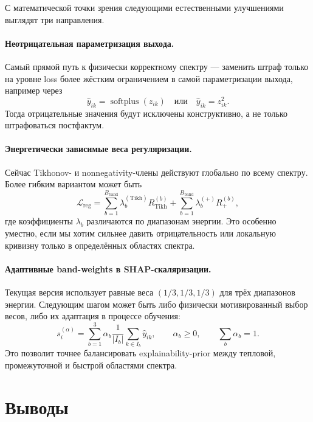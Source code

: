 С математической точки зрения следующими естественными улучшениями выглядят три направления.

\paragraph{Неотрицательная параметризация выхода.}
Самый прямой путь к физически корректному спектру --- заменить штраф только на уровне loss более жёстким ограничением в самой параметризации выхода, например через
\begin{equation}
\hat{y}_{ik} = \operatorname{softplus}(z_{ik})
\quad \text{или} \quad
\hat{y}_{ik} = z_{ik}^{2}.
\end{equation}
Тогда отрицательные значения будут исключены конструктивно, а не только штрафоваться постфактум.

\paragraph{Энергетически зависимые веса регуляризации.}
Сейчас Tikhonov- и nonnegativity-члены действуют глобально по всему спектру. Более гибким вариантом может быть
\begin{equation}
\mathcal{L}_{\mathrm{reg}} =
\sum_{b=1}^{B_{\mathrm{band}}}
\lambda_b^{(\mathrm{Tikh})} R_{\mathrm{Tikh}}^{(b)}
+
\sum_{b=1}^{B_{\mathrm{band}}}
\lambda_b^{(+)} R_{+}^{(b)},
\end{equation}
где коэффициенты $\lambda_b$ различаются по диапазонам энергии. Это особенно уместно, если мы хотим сильнее давить отрицательность или локальную кривизну только в определённых областях спектра.

\paragraph{Адаптивные band-weights в SHAP-скаляризации.}
Текущая версия использует равные веса $(1/3,1/3,1/3)$ для трёх диапазонов энергии. Следующим шагом может быть либо физически мотивированный выбор весов, либо их адаптация в процессе обучения:
\begin{equation}
s_i^{(\alpha)} =
\sum_{b=1}^{3}
\alpha_b
\frac{1}{|I_b|}
\sum_{k\in I_b}\hat{y}_{ik},
\qquad
\alpha_b \ge 0,\qquad \sum_b \alpha_b = 1.
\end{equation}
Это позволит точнее балансировать explainability-prior между тепловой, промежуточной и быстрой областями спектра.

\section{Выводы}

